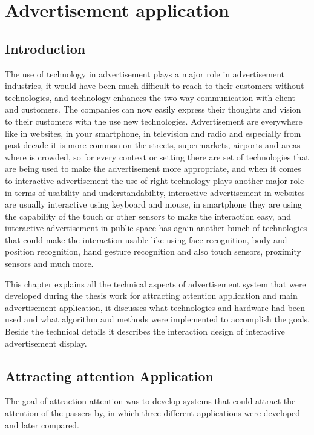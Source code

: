 \chapter{Advertisement application} %

\label{Chapter7} %
\newpage

\section{Introduction}
The use of technology in advertisement plays a major role in advertisement industries, it would have been much difficult to reach to their customers without technologies, and technology enhances the two-way communication with client and customers. The companies can now easily express their thoughts and vision to their customers with the use new technologies. Advertisement are everywhere like in websites, in your smartphone, in television and radio and especially from past decade it is more common on the streets, supermarkets, airports and areas where is crowded, so for every context or setting there are set of technologies that are being used to make the advertisement more appropriate, and when it comes to interactive advertisement the use of right technology plays another major role in terms of usability and understandability, interactive advertisement in websites are usually interactive using keyboard and mouse, in smartphone they are using the capability of the touch or other sensors to make the interaction easy, and interactive advertisement in public space has again another bunch of technologies that could make the interaction usable like using face recognition, body and position recognition, hand gesture recognition and also touch sensors, proximity sensors and much more.


This chapter explains all the technical aspects of advertisement system that were developed during the thesis work for attracting attention application and main advertisement application, it discusses what technologies and hardware had been used and what algorithm and methods were implemented to accomplish the goals. Beside the technical details it describes the interaction design of interactive advertisement display.


\iffalse
\section{Attracting attention Application}
The goal of attraction attention was to develop systems that could attract the attention of the passers-by, in which three different applications were developed and later compared.

